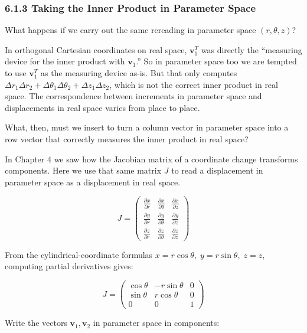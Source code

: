 \documentclass[a4paper,12pt,openany]{book}
\begin{document}
\hypertarget{taking-the-inner-product-in-parameter-space}{%
\subsubsection{6.1.3 Taking the Inner Product in Parameter
Space}\label{taking-the-inner-product-in-parameter-space}}

What happens if we carry out the same rereading in parameter space
\((r,\theta,z)\)?

In orthogonal Cartesian coordinates on real space, \(\mathbf{v}_1^T\)
was directly the ``measuring device for the inner product with
\(\mathbf{v}_1\).'' So in parameter space too we are tempted to use
\(\mathbf{v}_1^T\) as the measuring device as-is. But that only computes
\(\Delta r_1 \Delta r_2 + \Delta\theta_1 \Delta\theta_2 + \Delta z_1 \Delta z_2\),
which is not the correct inner product in real space. The correspondence
between increments in parameter space and displacements in real space
varies from place to place.

What, then, must we insert to turn a column vector in parameter space
into a row vector that correctly measures the inner product in real
space?

In Chapter 4 we saw how the Jacobian matrix of a coordinate change
transforms components. Here we use that same matrix \(J\) to read a
displacement in parameter space as a displacement in real space.

\[J = \begin{pmatrix}
\frac{\partial x}{\partial r} & \frac{\partial x}{\partial \theta} & \frac{\partial x}{\partial z} \\
\frac{\partial y}{\partial r} & \frac{\partial y}{\partial \theta} & \frac{\partial y}{\partial z} \\
\frac{\partial z}{\partial r} & \frac{\partial z}{\partial \theta} & \frac{\partial z}{\partial z}
\end{pmatrix}\]

From the cylindrical-coordinate formulas
\(x = r\cos\theta,\; y = r\sin\theta,\; z = z\), computing partial
derivatives gives:

\[J = \begin{pmatrix}
\cos\theta & -r\sin\theta & 0 \\
\sin\theta & r\cos\theta & 0 \\
0 & 0 & 1
\end{pmatrix}\]

Write the vectors \(\mathbf{v}_1, \mathbf{v}_2\) in parameter space in
components:
\end{document}
